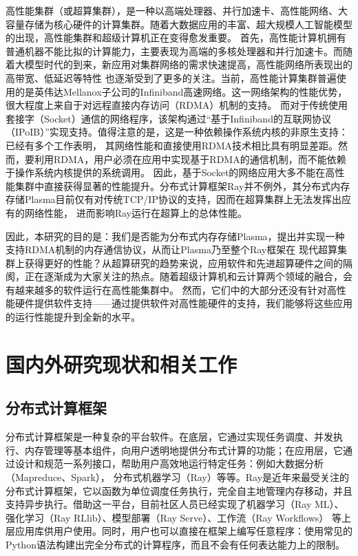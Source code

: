 高性能集群（或超算集群），是一种以高端处理器、并行加速卡、高性能网络、大容量存储为核心硬件的计算集群。随着大数据应用的丰富、超大规模人工智能模型的出现，高性能集群和超级计算机正在变得愈发重要。
首先，高性能计算机拥有普通机器不能比拟的计算能力，主要表现为高端的多核处理器和并行加速卡。而随着大模型时代的到来，新应用对集群网络的需求快速提高，高性能网络所表现出的高带宽、低延迟等特性
也逐渐受到了更多的关注。当前，高性能计算集群普遍使用的是英伟达Mellanox子公司的Infiniband高速网络。这一网络架构的性能优势，很大程度上来自于对远程直接内存访问（RDMA）机制的支持。
而对于传统使用套接字（Socket）通信的网络程序，该架构通过“基于Infiniband的互联网协议（IPoIB）”实现支持。值得注意的是，这是一种依赖操作系统内核的非原生支持：已经有多个工作表明，
其网络性能和直接使用RDMA技术相比具有明显差距。然而，要利用RDMA，用户必须在应用中实现基于RDMA的通信机制，而不能依赖于操作系统内核提供的系统调用。
因此，基于Socket的网络应用大多不能在高性能集群中直接获得显著的性能提升。分布式计算框架Ray并不例外，其分布式内存存储Plasma目前仅有对传统TCP/IP协议的支持，因而在超算集群上无法发挥出应有的网络性能，
进而影响Ray运行在超算上的总体性能。

因此，本研究的目的是：我们是否能为分布式内存存储Plasma，提出并实现一种支持RDMA机制的内存通信协议，从而让Plasma乃至整个Ray框架在
现代超算集群上获得更好的性能？从超算研究的趋势来说，应用软件和先进超算硬件之间的隔阂，正在逐渐成为大家关注的热点。随着超级计算机和云计算两个领域的融合，会有越来越多的软件运行在高性能集群中。
然而，它们中的大部分还没有针对高性能硬件提供软件支持——通过提供软件对高性能硬件的支持，我们能够将这些应用的运行性能提升到全新的水平。

\section{国内外研究现状和相关工作}
\label{sec:related_work}

\subsection{分布式计算框架}

分布式计算框架是一种复杂的平台软件。在底层，它通过实现任务调度、并发执行、内存管理等基本组件，向用户透明地提供分布式计算的功能；在应用层，它通过设计和规范一系列接口，帮助用户高效地运行特定任务：例如大数据分析（Mapreduce、Spark），
分布式机器学习（Ray）等等。Ray是近年来最受关注的分布式计算框架，它以函数为单位调度任务执行，完全自主地管理内存移动，并且支持异步执行。借助这一平台，目前社区人员已经实现了机器学习（Ray ML）、强化学习（Ray RLlib）、模型部署（Ray Serve）、工作流（Ray Workflows）
等上层应用库供用户使用。同时，用户也可以直接在框架上编写任意程序：使用常见的Python语法构建出完全分布式的计算程序，而且不会有任何表达能力上的限制。

